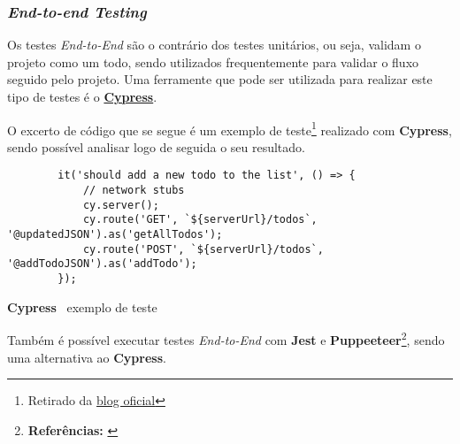\subsubsection{\textit{End-to-end Testing}}

Os testes \textit{End-to-End} são o contrário dos testes unitários, ou seja, validam o projeto como um todo, sendo utilizados frequentemente para validar o fluxo seguido pelo projeto. Uma ferramente que pode ser utilizada para realizar este tipo de testes é o \textbf{\href{https://cypress.io}{Cypress}}.

O excerto de código que se segue é um exemplo de teste\footnote{Retirado da \href{https://www.cypress.io/blog/2019/02/05/modern-frontend-testing-with-cypress/}{blog oficial}} realizado com \textbf{Cypress}, sendo possível analisar logo de seguida o seu resultado.

\begin{longlisting}
	\begin{verbatim}
		it('should add a new todo to the list', () => {
			// network stubs
			cy.server();
			cy.route('GET', `${serverUrl}/todos`, '@updatedJSON').as('getAllTodos');
			cy.route('POST', `${serverUrl}/todos`, '@addTodoJSON').as('addTodo');
		});
	\end{verbatim}
	\caption{\textbf{Cypress} \textemdash~exemplo de teste}
\end{longlisting}


Também é possível executar testes \textit{End-to-End} com \textbf{Jest} e \textbf{Puppeeteer}\footnote{\textbf{Referências:} \cite{endToEndJestPuppeteer,endToEndWJest}}, sendo uma alternativa ao \textbf{Cypress}.

